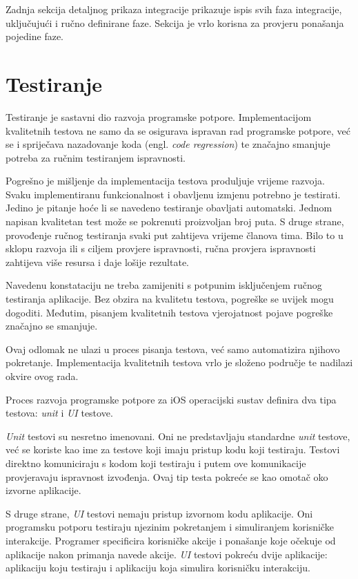 \documentclass[times, utf8, diplomski, numeric]{fer}
\newcommand{\eng}[1]{(engl. \textit{#1})}
\begin{document}
Zadnja sekcija detaljnog prikaza integracije prikazuje ispis svih faza integracije, uključujući i ručno definirane faze. Sekcija je vrlo korisna za provjeru ponašanja pojedine faze.

\section{Testiranje}

Testiranje je sastavni dio razvoja programske potpore. Implementacijom kvalitetnih testova ne samo da se osigurava ispravan rad programske potpore, već se i spriječava nazadovanje koda \eng{code regression} te značajno smanjuje potreba za ručnim testiranjem ispravnosti\citep{wiki:SoftwareTesting}.

Pogrešno je mišljenje da implementacija testova produljuje vrijeme razvoja. Svaku implementiranu funkcionalnost i obavljenu izmjenu potrebno je testirati. Jedino je pitanje hoće li se navedeno testiranje obavljati automatski. Jednom napisan kvalitetan test može se pokrenuti proizvoljan broj puta. S druge strane, provođenje ručnog testiranja svaki put zahtijeva vrijeme članova tima. Bilo to u sklopu razvoja ili s ciljem provjere ispravnosti, ručna provjera ispravnosti zahtijeva više resursa i daje lošije rezultate.

Navedenu konstataciju ne treba zamijeniti s potpunim isključenjem ručnog testiranja aplikacije. Bez obzira na kvalitetu testova, pogreške se uvijek mogu dogoditi. Međutim, pisanjem kvalitetnih testova vjerojatnost pojave pogreške značajno se smanjuje.

Ovaj odlomak ne ulazi u proces pisanja testova, već samo automatizira njihovo pokretanje. Implementacija kvalitetnih testova vrlo je složeno područje te nadilazi okvire ovog rada.

Proces razvoja programske potpore za iOS operacijski sustav definira dva tipa testova: \textit{unit} i \textit{UI} testove.

\textit{Unit} testovi su nesretno imenovani. Oni ne predstavljaju standardne \textit{unit} testove, već se koriste kao ime za testove koji imaju pristup kodu koji testiraju. Testovi direktno komuniciraju s kodom koji testiraju i putem ove komunikacije provjeravaju ispravnost izvođenja. Ovaj tip testa pokreće se kao omotač oko izvorne aplikacije.

S druge strane, \textit{UI} testovi nemaju pristup izvornom kodu aplikacije. Oni programsku potporu testiraju njezinim pokretanjem i simuliranjem korisničke interakcije. Programer specificira korisničke akcije i ponašanje koje očekuje od aplikacije nakon primanja navede akcije. \textit{UI} testovi pokreću dvije aplikacije: aplikaciju koju testiraju i aplikaciju koja simulira korisničku interakciju.
\end{document}
